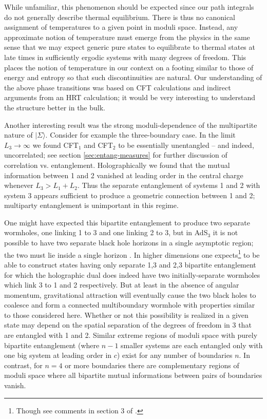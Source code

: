 \documentclass[12pt]{article}
\numberwithin{equation}{section}
\begin{document}
While unfamiliar, this phenomenon should be expected since our path integrals do not generally describe thermal equilibrium.  There is thus no canonical assignment of temperatures to a given point in moduli space.  Instead, any approximate notion of temperature must emerge from the physics in the same sense that we may expect generic pure states to equilibrate to thermal states at late times in sufficiently ergodic systems with many degrees of freedom.  This places the notion of temperature in our context on a footing similar to those of energy and entropy so that such discontinuities are natural.  Our understanding of the above phase transitions was based on CFT calculations and indirect arguments from an HRT calculation; it would be very interesting to understand the structure better
in the bulk.

Another interesting result was the strong moduli-dependence of the multipartite nature of $|\Sigma \rangle$.  Consider for example the three-boundary case.  In the limit $L_3 \to \infty$ we found CFT${}_1$ and CFT${}_2$ to be essentially unentangled -- and indeed, uncorrelated; see section \ref{sec:entang-measures} for further discussion of correlation vs. entanglement.  Holographically we found that the mutual information between 1 and 2 vanished at leading order in the central charge whenever $L_3 > L_1 + L_2$. Thus the separate entanglement of systems 1 and 2 with system 3 appears sufficient to produce a geometric connection between 1 and 2; multiparty entanglement  is unimportant in this regime.

One might have expected this bipartite entanglement to produce two separate wormholes, one linking 1 to 3 and one linking 2 to 3, but in AdS$_3$ it is not possible to have two separate black hole horizons in a single asymptotic region; the two must lie inside a single horizon \cite{Steif:1995pq}.  In higher dimensions one expects\footnote{Though see comments in section 3 of \cite{Wall:2012uf}.} to be able to construct states having only separate 1,3 and 2,3 bipartite entanglement for which the holographic dual does indeed have two initially-separate wormholes which link 3 to 1 and 2 respectively. But at least in the absence of angular momentum, gravitational attraction will eventually cause the two black holes to coalesce and form a connected multiboundary wormhole with properties similar to those considered here.  Whether or not this possibility is realized in a given state may depend on the spatial separation of the degrees of freedom in 3 that are entangled with 1 and 2.  Similar extreme regions of moduli space with purely bipartite entanglement (where $n-1$ smaller systems are each entangled only with one big system at leading order in $c$) exist for any number of boundaries $n$.   In contrast, for $n=4$ or more boundaries there are complementary regions of moduli space where all bipartite mutual informations between pairs of boundaries vanish.
\end{document}
